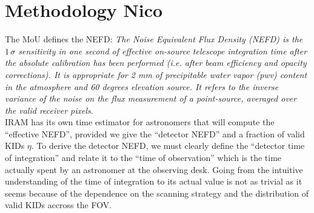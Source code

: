 


\section{Methodology {\color{blue} Nico}}

The MoU defines the NEFD:  \emph{The Noise Equivalent Flux Density (NEFD)
  is the $1\,\sigma$ sensitivity in one second of effective on-source telescope
  integration time after the absolute calibration has been performed (i.e. after
  beam efficiency and opacity corrections). It is appropriate for 2 mm of
  precipitable water vapor (pwv) content in the atmosphere and 60 degrees
  elevation source. It refers to the inverse variance of the noise on the flux
  measurement of a point-source, averaged over the valid receiver pixels}.\\

IRAM has its own time estimator for astronomers that will compute the ``effective NEFD'',
provided we give the ``detector NEFD'' and a fraction of valid KIDs $\eta$. To
derive the detector NEFD, we must clearly define the ``detector time of
integration'' and relate it to the ``time of observation'' which is the time
actually spent by an astronomer at the observing desk. Going from the intuitive
understanding of the time of integration to its actual value is not as trivial
as it seems because of the dependence on the scanning strategy and the
distribution of valid KIDs accross the FOV.


